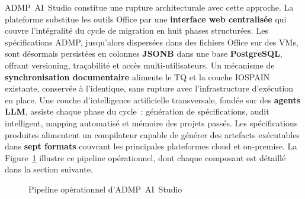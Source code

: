 ADMP~AI~Studio constitue une rupture architecturale avec cette approche. La plateforme substitue les outils Office par une \textbf{interface web centralisée} qui couvre l'intégralité du cycle de migration en huit phases structurées. Les spécifications ADMP, jusqu'alors dispersées dans des fichiers Office sur des VMs, sont désormais persistées en colonnes \textbf{JSONB} dans une base \textbf{PostgreSQL}, offrant versioning, traçabilité et accès multi-utilisateurs. Un mécanisme de \textbf{synchronisation documentaire} alimente le TQ et la couche IOSPAIN existante, conservée à l'identique, sans rupture avec l'infrastructure d'exécution en place. Une couche d'intelligence artificielle transversale, fondée sur des \textbf{agents LLM}, assiste chaque phase du cycle~: génération de spécifications, audit intelligent, mapping automatisé et mémoire des projets passés. Les spécifications produites alimentent un compilateur capable de générer des artefacts exécutables dans \textbf{sept formats} couvrant les principales plateformes cloud et on-premise. La Figure~\ref{fig:admp-pipeline} illustre ce pipeline opérationnel, dont chaque composant est détaillé dans la section suivante.

\begin{figure}[H]
\centering
{}
\caption{Pipeline opérationnel d'ADMP~AI~Studio}
\label{fig:admp-pipeline}
\end{figure}

